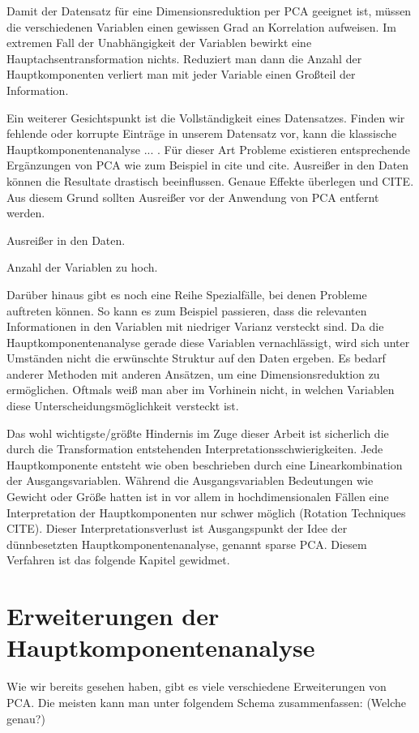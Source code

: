 Damit der Datensatz für eine Dimensionsreduktion per PCA geeignet ist, müssen die verschiedenen Variablen einen gewissen Grad an Korrelation aufweisen. Im extremen Fall der Unabhängigkeit der Variablen bewirkt eine Hauptachsentransformation nichts. Reduziert man dann die Anzahl der Hauptkomponenten verliert man mit jeder Variable einen Großteil der Information.

Ein weiterer Gesichtspunkt ist die Vollständigkeit eines Datensatzes. Finden wir fehlende oder korrupte Einträge in unserem Datensatz vor, kann die klassische Hauptkomponentenanalyse ... . Für dieser Art Probleme existieren entsprechende Ergänzungen von PCA wie zum Beispiel in cite und cite. Ausreißer in den Daten können die Resultate drastisch beeinflussen. Genaue Effekte überlegen und CITE. Aus diesem Grund sollten Ausreißer vor der Anwendung von PCA entfernt werden.

Ausreißer in den Daten.

Anzahl der Variablen zu hoch.

Darüber hinaus gibt es noch eine Reihe Spezialfälle, bei denen Probleme auftreten können. So kann es zum Beispiel passieren, dass die relevanten Informationen in den Variablen mit niedriger Varianz versteckt sind. Da die Hauptkomponentenanalyse gerade diese Variablen vernachlässigt, wird sich unter Umständen nicht die erwünschte Struktur auf den Daten ergeben. Es bedarf anderer Methoden mit anderen Ansätzen, um eine Dimensionsreduktion zu ermöglichen. Oftmals weiß man aber im Vorhinein nicht, in welchen Variablen diese Unterscheidungsmöglichkeit versteckt ist.

Das wohl wichtigste/größte Hindernis im Zuge dieser Arbeit ist sicherlich die durch die Transformation entstehenden Interpretationsschwierigkeiten. Jede Hauptkomponente entsteht wie oben beschrieben durch eine Linearkombination der Ausgangsvariablen. Während die Ausgangsvariablen Bedeutungen wie Gewicht oder Größe hatten ist in vor allem in hochdimensionalen Fällen eine Interpretation der Hauptkomponenten nur schwer möglich (Rotation Techniques CITE). Dieser Interpretationsverlust ist Ausgangspunkt der Idee der dünnbesetzten Hauptkomponentenanalyse, genannt sparse PCA. Diesem Verfahren ist das folgende Kapitel gewidmet.

\section{Erweiterungen der Hauptkomponentenanalyse}
Wie wir bereits gesehen haben, gibt es viele verschiedene Erweiterungen von PCA. Die meisten kann man unter folgendem Schema zusammenfassen: (Welche genau?)

